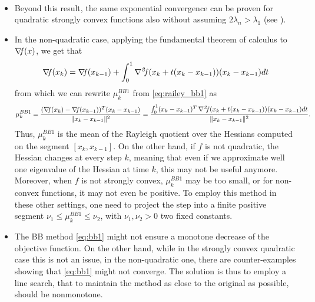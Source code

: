 \documentclass[10pt,a4paper]{article}
\begin{document}
\begin{remark}$\;$\\
	\vspace{-5mm}
	\begin{itemize}
		\item Beyond this result, the same exponential convergence can be proven for quadratic strongly convex functions also without assuming $2\lambda_n>\lambda_1$ (see \cite{dai02a}). 
		\item In the non-quadratic case, applying the fundamental theorem of calculus to $\operatorname*{\mathit{\nabla \!f}}(x)$, we get that
		\begin{equation*}
			\operatorname*{\mathit{\nabla \!f}}(x_k)=\operatorname*{\mathit{\nabla \!f}}(x_{k-1}) + \int_{0}^{1} \operatorname*{\mathit{\nabla^2 \!f}}(x_k+t(x_k-x_{k-1})) (x_k-x_{k-1}) dt
		\end{equation*} 
		from which we can rewrite $\mu_k^{BB1}$ from \eqref{eq:railey_bb1} as
		\begin{equation*}
			\mu_k^{BB1} = \frac{(\operatorname*{\mathit{\nabla \!f}}(x_k)-\operatorname*{\mathit{\nabla \!f}}(x_{k-1}))^T(x_k-x_{k-1})}{\|x_k - x_{k-1}\|^2} = \frac{\int_{0}^{1}(x_k-x_{k-1})^T \operatorname*{\mathit{\nabla^2 \!f}}(x_k+t(x_k-x_{k-1})) (x_k-x_{k-1}) dt }{\|x_k - x_{k-1}\|^2}.
		\end{equation*}
		Thus, $\mu_k^{BB1}$ is the mean of the Rayleigh quotient over the Hessians computed on the segment $[x_k, x_{k-1}]$. On the other hand, if $f$ is not quadratic, the Hessian changes at every step $k$, meaning that even if we approximate well one eigenvalue of the Hessian at time $k$, this may not be useful anymore. Moreover, when $f$ is not strongly convex, $\mu_k^{BB1}$ may be too small, or for non-convex functions, it may not even be positive. To employ this method in these other settings, one need to project the step into a finite positive segment $\nu_1\leq \mu_k^{BB1}\leq \nu_2$, with $\nu_1, \nu_2>0$ two fixed constants.
		\item The BB method \eqref{eq:bb1} might not ensure a monotone decrease of the objective function. On the other hand, while in the strongly convex quadratic case this is not an issue, in the non-quadratic one, there are counter-examples showing that \eqref{eq:bb1} might not converge. The solution is thus to employ a line search, that to maintain the method as close to the original as possible, should be nonmonotone. 
	\end{itemize}
\end{remark}
\end{document}
